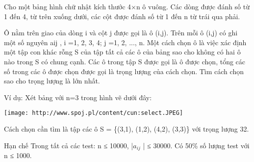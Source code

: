 Cho một bảng hình chữ nhật kích thước 4×n ô vuông. Các dòng được đánh số từ 1 đến 4, từ trên xuống dưới, các cột được đánh số từ 1 đến n từ trái qua phải.

Ô nằm trên giao của dòng i và cột j được gọi là ô (i,j). Trên mỗi ô (i,j) có ghi một số nguyên aij , i =1, 2, 3, 4; j =1, 2, ..., n. Một cách chọn ô là việc xác định một tập con khác rỗng S của tập tất cả các ô của bảng sao cho không có hai ô nào trong S có chung cạnh. Các ô trong tập S được gọi là ô được chọn, tổng các số trong các ô được chọn được gọi là trọng lượng của cách chọn. Tìm cách chọn sao cho trọng lượng là lớn nhất.

Ví dụ: Xét bảng với n=3 trong hình vẽ dưới đây:


\texttt{[image: http://www.spoj.pl/content/cun:select.JPEG]}

Cách chọn cần tìm là tập các ô S = \{(3,1), (1,2), (4,2), (3,3)\} với trọng lượng 32.

Hạn chế
Trong tất cả các test: n ≤ 10000, |$a_{ij}$ | ≤ 30000. Có 50\% số lượng test với n ≤ 1000.